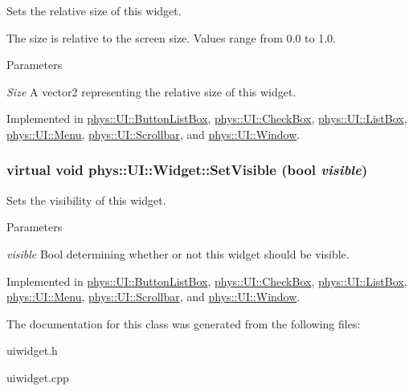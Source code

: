 Sets the relative size of this widget. 

The size is relative to the screen size. Values range from 0.0 to 1.0. 
\begin{DoxyParams}{Parameters}
\item[{\em Size}]A vector2 representing the relative size of this widget. \end{DoxyParams}


Implemented in \hyperlink{classphys_1_1UI_1_1ButtonListBox_aca2c048f3edb2f623707859225a16be9}{phys::UI::ButtonListBox}, \hyperlink{classphys_1_1UI_1_1CheckBox_abaf77736744be54dc72507e16122ecf5}{phys::UI::CheckBox}, \hyperlink{classphys_1_1UI_1_1ListBox_a73f4526ffb4d35a431bb62c816257169}{phys::UI::ListBox}, \hyperlink{classphys_1_1UI_1_1Menu_a1f8826ab4ab9e76441704634746d3147}{phys::UI::Menu}, \hyperlink{classphys_1_1UI_1_1Scrollbar_af4c4061cf2ddeb783ee52acb805f0cfb}{phys::UI::Scrollbar}, and \hyperlink{classphys_1_1UI_1_1Window_aeaf0b107e6bcf688635dd4719871bd9a}{phys::UI::Window}.

\hypertarget{classphys_1_1UI_1_1Widget_ab049233d8d5522a6ab42654b8924a3e0}{
\subsubsection[{SetVisible}]{\setlength{\rightskip}{0pt plus 5cm}virtual void phys::UI::Widget::SetVisible (bool {\em visible})}}
\label{d9/d48/classphys_1_1UI_1_1Widget_ab049233d8d5522a6ab42654b8924a3e0}


Sets the visibility of this widget. 


\begin{DoxyParams}{Parameters}
\item[{\em visible}]Bool determining whether or not this widget should be visible. \end{DoxyParams}


Implemented in \hyperlink{classphys_1_1UI_1_1ButtonListBox_acee378e954050801fa8fffe835441bf4}{phys::UI::ButtonListBox}, \hyperlink{classphys_1_1UI_1_1CheckBox_aac2babdb951a7b716b5cfff9b925420f}{phys::UI::CheckBox}, \hyperlink{classphys_1_1UI_1_1ListBox_abb3c87bf6669100296c1fa4f4913ea33}{phys::UI::ListBox}, \hyperlink{classphys_1_1UI_1_1Menu_a4847e0de055a9c2f708f98742fa59a87}{phys::UI::Menu}, \hyperlink{classphys_1_1UI_1_1Scrollbar_a2d8997e0bbbb1c17af5128fea98fb1e4}{phys::UI::Scrollbar}, and \hyperlink{classphys_1_1UI_1_1Window_a351439e78013bc87ecadcc00bce08573}{phys::UI::Window}.



The documentation for this class was generated from the following files:\begin{DoxyCompactItemize}
\item 
uiwidget.h\item 
uiwidget.cpp\end{DoxyCompactItemize}
